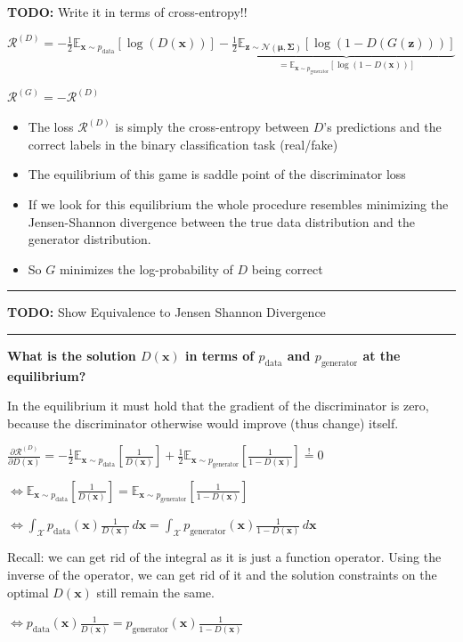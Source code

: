 \documentclass[a2paper,8pt]{extarticle}
\newcommand{\cN}{\mathcal{N}}
\newcommand{\cR}{\mathcal{R}}
\newcommand{\cX}{\mathcal{X}}
\newcommand{\Exp}[2][]{{\mathbb{E}_{#1}}\left[ #2
\right]}
\newcommand{\mbeq}{\stackrel{!}{=}}
\newcommand{\mat}[1]{\mathbf{#1}}
\renewcommand{\vec}[1]{\mathbf{#1}}
\newcommand{\vx}{\vec{x}}
\newcommand{\vz}{\vec{z}}
\newcommand{\vmu}{\boldsymbol{\mu}}
\newcommand{\MSigma}{\mat{\Sigma}}
\newcommand{\todo}[1]{\textbf{TODO:} #1}
\newcommand{\todo}[1]{%
}
\newcommand{\sep}{\vspace{0pt}\noindent\hrule\vspace{0pt}}
\newcommand{\sep}{\vspace{5pt}\noindent\hrule\vspace{5pt}}
\begin{document}
\begin{landscape}
\begin{multicols*}{7}
\todo{Write it in terms of cross-entropy!!}

$
\cR^{(D)}
=
-\frac{1}{2}
\Exp[\vx\sim p_{\text{data}}]{\log(D(\vx))}
-\frac{1}{2}
\underbrace{\Exp[\vz\sim \cN(\vmu,\MSigma)]{\log(1-D(G(\vz)))}}_{=
\Exp[\vx\sim p_{\text{generator}}]{\log(1-D(\vx))}}
$

$
\cR^{(G)}
=
-\cR^{(D)}
$ 

\begin{itemize}
  \item The loss $\cR^{(D)}$ is simply the cross-entropy between $D$'s
  predictions and the correct labels in the binary classification task (real/fake)
  \item The equilibrium of this game is saddle point of the discriminator loss
  \item If we look for this equilibrium the whole procedure resembles
  minimizing the Jensen-Shannon divergence between the true data distribution
  and the generator distribution.
  \item So $G$ minimizes the log-probability of $D$ being correct
\end{itemize}

\sep

\todo{Show Equivalence to Jensen Shannon Divergence}

\sep

\textbf{What is the solution $D(\vx)$ in terms of $p_{\text{data}}$ and
$p_{\text{generator}}$ at the equilibrium?}

In the equilibrium it must hold that the gradient of the discriminator is zero,
because the discriminator otherwise would improve (thus change) itself.

$
\frac{\partial \cR^{(D)}}{\partial D(\vx)}
=
-\frac{1}{2}
\Exp[\vx\sim p_{\text{data}}]{\frac{1}{D(\vx)}}
+\frac{1}{2}
\Exp[\vx\sim p_{\text{generator}}]{\frac{1}{1-D(\vx)}}
\mbeq 0
$

$
\Longleftrightarrow
\Exp[\vx\sim p_{\text{data}}]{\frac{1}{D(\vx)}}
=
\Exp[\vx\sim p_{\text{generator}}]{\frac{1}{1-D(\vx)}}
$

$
\Longleftrightarrow
\int_{\cX} p_{\text{data}}(\vx)\frac{1}{D(\vx)}\,d\vx
=
\int_{\cX} p_{\text{generator}}(\vx)\frac{1}{1-D(\vx)}\,d\vx
$

Recall: we can get rid of the integral as it is just a function operator. Using
the inverse of the operator, we can get rid of it and the solution constraints
on the optimal $D(\vx)$ still remain the same.

$
\Longleftrightarrow
p_{\text{data}}(\vx)\frac{1}{D(\vx)}
=
p_{\text{generator}}(\vx)\frac{1}{1-D(\vx)}
$


\end{multicols*}
\end{landscape}
\end{document}
